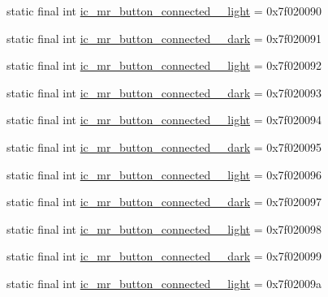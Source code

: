 \begin{CompactItemize}
\item 
static final int \hyperlink{classandroid_1_1support_1_1v7_1_1recyclerview_1_1_r_1_1drawable_ff6c2fe7bf3a40dbd578095acfa95b9b}{ic\_\-mr\_\-button\_\-connected\_\_\-light} = 0x7f020090
\item 
static final int \hyperlink{classandroid_1_1support_1_1v7_1_1recyclerview_1_1_r_1_1drawable_6470c764899582055ee3e1059c3f70c0}{ic\_\-mr\_\-button\_\-connected\_\_\-dark} = 0x7f020091
\item 
static final int \hyperlink{classandroid_1_1support_1_1v7_1_1recyclerview_1_1_r_1_1drawable_785c1bf53361b8e6466a072b5ae2e16b}{ic\_\-mr\_\-button\_\-connected\_\_\-light} = 0x7f020092
\item 
static final int \hyperlink{classandroid_1_1support_1_1v7_1_1recyclerview_1_1_r_1_1drawable_564ac82517fb994e6dab6a73bb859225}{ic\_\-mr\_\-button\_\-connected\_\_\-dark} = 0x7f020093
\item 
static final int \hyperlink{classandroid_1_1support_1_1v7_1_1recyclerview_1_1_r_1_1drawable_c297359710d565665577381217162bab}{ic\_\-mr\_\-button\_\-connected\_\_\-light} = 0x7f020094
\item 
static final int \hyperlink{classandroid_1_1support_1_1v7_1_1recyclerview_1_1_r_1_1drawable_e6ccb400f86f48f5a5d73b9ad16389d5}{ic\_\-mr\_\-button\_\-connected\_\_\-dark} = 0x7f020095
\item 
static final int \hyperlink{classandroid_1_1support_1_1v7_1_1recyclerview_1_1_r_1_1drawable_f01908aae0683fbe328981f249f57786}{ic\_\-mr\_\-button\_\-connected\_\_\-light} = 0x7f020096
\item 
static final int \hyperlink{classandroid_1_1support_1_1v7_1_1recyclerview_1_1_r_1_1drawable_7c3e5c789bff8ed1343b8a4484309864}{ic\_\-mr\_\-button\_\-connected\_\_\-dark} = 0x7f020097
\item 
static final int \hyperlink{classandroid_1_1support_1_1v7_1_1recyclerview_1_1_r_1_1drawable_41eea534bbc79a6c6fb0cb485971c885}{ic\_\-mr\_\-button\_\-connected\_\_\-light} = 0x7f020098
\item 
static final int \hyperlink{classandroid_1_1support_1_1v7_1_1recyclerview_1_1_r_1_1drawable_30be64d93d0d138f3ab7795891d5fb33}{ic\_\-mr\_\-button\_\-connected\_\_\-dark} = 0x7f020099
\item 
static final int \hyperlink{classandroid_1_1support_1_1v7_1_1recyclerview_1_1_r_1_1drawable_395869727cedf63de007718380677155}{ic\_\-mr\_\-button\_\-connected\_\_\-light} = 0x7f02009a
\item 

\end{CompactItemize}
